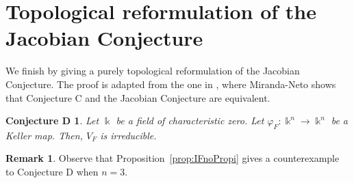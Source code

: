 \documentclass[11pt,reqno]{amsart}
\newtheorem*{conjecture}{Conjecture D}
\theoremstyle{definition}
\newtheorem{remark}[theorem]{Remark}
\newcommand{\mbk}{\mbox{$\Bbbk$}}
\begin{document}
\section{Topological reformulation of the Jacobian Conjecture}

We finish by giving a purely topological reformulation of the Jacobian Conjecture.
The proof is adapted from the one in \cite[Conjecture C]{mn}, where Miranda-Neto shows that
Conjecture C and the Jacobian Conjecture are equivalent.

\begin{conjecture} 
Let $\mbk$ be a field of characteristic zero. 
Let $\varphi_F:\mbk^n\to\mbk^n$ be a Keller map. Then, $V_F$ is irreducible. 
\end{conjecture}

\begin{remark}
Observe that Proposition~\ref{prop:IFnoPropi} gives a counterexample to Conjecture D when $n=3$.
\end{remark}
\end{document}
